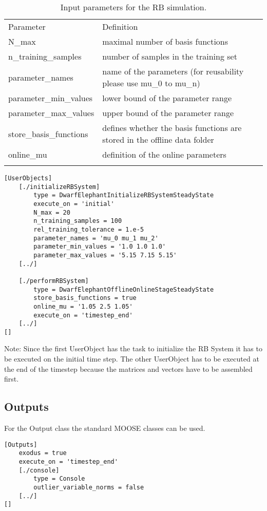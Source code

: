 \documentclass[11pt, a4paper, DIV=14]{scrartcl}
\begin{document}
\begin{table}
\caption{Input parameters for the RB simulation.}
\begin{tabular}{|p{4cm}|p{8cm}|}
\hline\noalign{\smallskip}
Parameter & Definition\\
\noalign{\smallskip}\hline\noalign{\smallskip}
N\_max & maximal number of basis functions \\
n\_training\_samples & number of samples in the training set\\
parameter\_names & name of the parameters (for reusability please use mu\_0 to mu\_n)\\
parameter\_min\_values & lower bound of the parameter range \\
parameter\_max\_values & upper bound of the parameter range \\
store\_basis\_functions & defines whether the basis functions are stored in the offline data folder \\
online\_mu & definition of the online parameters \\
\noalign{\smallskip}\hline
\end{tabular}
\label{RB parameters_DE}
\end{table}


\begin{lstlisting}
[UserObjects]
    [./initializeRBSystem]
        type = DwarfElephantInitializeRBSystemSteadyState
        execute_on = 'initial'
        N_max = 20
        n_training_samples = 100
        rel_training_tolerance = 1.e-5
        parameter_names = 'mu_0 mu_1 mu_2'   
        parameter_min_values = '1.0 1.0 1.0'
        parameter_max_values = '5.15 7.15 5.15'
    [../]

    [./performRBSystem]
        type = DwarfElephantOfflineOnlineStageSteadyState
        store_basis_functions = true
        online_mu = '1.05 2.5 1.05'
        execute_on = 'timestep_end'
    [../]
[]
\end{lstlisting}

Note: Since the first UserObject has the task to initialize the RB System it has to be executed on the initial time step. The other UserObject has to be executed at the end of the timestep because the matrices and vectors have to be assembled first.

\subsection{Outputs}
For the Output class the standard MOOSE classes can be used.
\begin{lstlisting}
[Outputs]
    exodus = true
    execute_on = 'timestep_end'
    [./console]
        type = Console
        outlier_variable_norms = false
    [../]
[]
\end{lstlisting}
\end{document}
